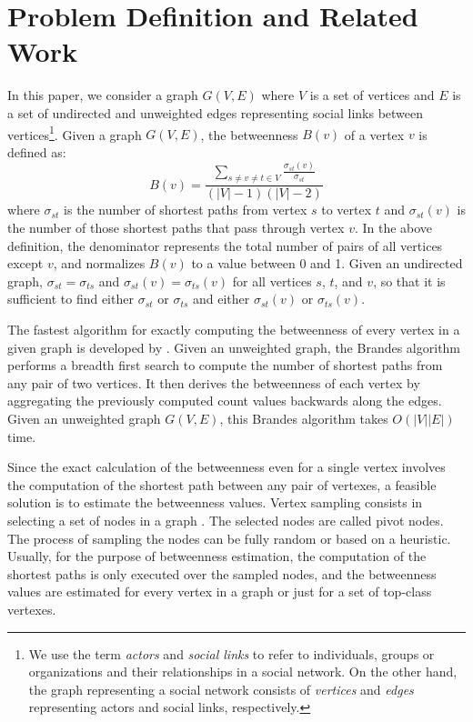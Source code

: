 \section{Problem Definition and Related Work}
In this paper, we consider a graph $G(V, E)$ where $V$ is a set of vertices and $E$ is a set of undirected and unweighted edges representing social links between vertices\footnote{We use the term {\em actors} and {\em social links} to refer to individuals, groups or organizations and their relationships in a social network. On the other hand, the graph representing a social network consists of {\em vertices} and {\em edges} representing actors and social links, respectively.}. Given a graph $G(V, E)$, the betweenness $B(v)$ of a vertex $v$ is defined as:
\begin{equation}\label{bet}
B(v) = \frac{\sum_{s \neq v \neq t \in V}\frac{\sigma_{st}(v)}{\sigma_{st}}}{(|V|-1)(|V|-2)}
\end{equation} where $\sigma_{st}$ is the number of shortest paths from vertex $s$ to vertex $t$ and $\sigma_{st}(v)$ is the number of those shortest paths that pass through vertex $v$. 
In the above definition, the denominator represents the total number of pairs of all vertices except $v$, and normalizes $B(v)$ to a value between 0 and 1. Given an undirected graph, $\sigma_{st}=\sigma_{ts}$ and $\sigma_{st}(v)=\sigma_{ts}(v)$ for all vertices $s$, $t$, and $v$, so that it is sufficient to find either $\sigma_{st}$ or $\sigma_{ts}$ and either $\sigma_{st}(v)$ or $\sigma_{ts}(v)$.

The fastest algorithm for exactly computing the betweenness of every vertex in a given graph is developed by \citet{Brandes01afaster}. Given an unweighted graph, the Brandes algorithm performs a breadth first search to compute the number of shortest paths from any pair of two vertices. It then derives the betweenness of each vertex by aggregating the previously computed count values backwards along the edges. Given an unweighted graph $G(V,E)$, this Brandes algorithm takes $O(|V||E|)$ time.

Since the exact calculation of the betweenness even for a single vertex involves the computation of the shortest path between any pair of vertexes, a feasible solution is to estimate the betweenness values. Vertex sampling consists in selecting a set of nodes in
a graph \citep{Eppstein:2001:FAC:365411.365449,10.1093/comjnl/bxu003,10.1007/978-3-319-16112-9_11}. The selected nodes are called pivot nodes. The process of sampling the nodes can be fully random or based on a heuristic. Usually, for the purpose of betweenness estimation, the computation of the shortest paths is only executed over the sampled nodes, and the betweenness values are estimated for every vertex in a graph or just for a set of top-class vertexes.

